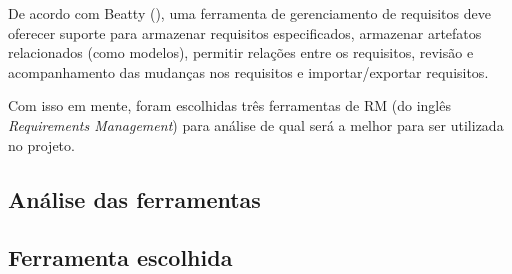     De acordo com Beatty (\citeyear{beatty13}), uma ferramenta de gerenciamento de requisitos deve oferecer
    suporte para armazenar requisitos especificados, armazenar artefatos relacionados (como modelos), permitir relações
    entre os requisitos, revisão e acompanhamento das mudanças nos requisitos e importar/exportar requisitos.
    
    Com isso em mente, foram escolhidas três ferramentas de RM (do inglês \textit{Requirements Management}) para análise de
    qual será a melhor para ser utilizada no projeto.  
    
    \subsection{Análise das ferramentas}
    
      
    
    \subsection{Ferramenta escolhida}
      
      